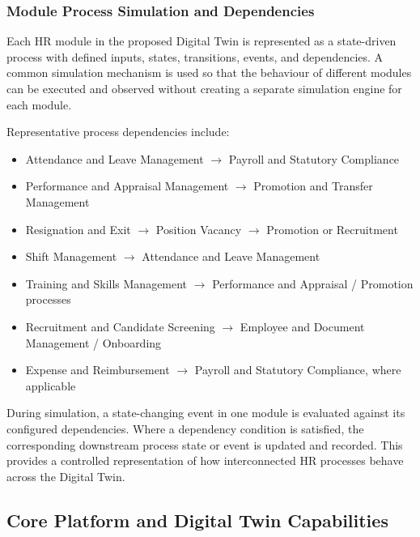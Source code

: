 \documentclass[12pt,a4paper]{article}
\begin{document}
\subsubsection{Module Process Simulation and Dependencies}

Each HR module in the proposed Digital Twin is represented as a
state-driven process with defined inputs, states, transitions,
events, and dependencies. A common simulation mechanism is used so
that the behaviour of different modules can be executed and observed
without creating a separate simulation engine for each module.

Representative process dependencies include:

\begin{itemize}
    \item Attendance and Leave Management $\rightarrow$ Payroll and
    Statutory Compliance
    \item Performance and Appraisal Management $\rightarrow$
    Promotion and Transfer Management
    \item Resignation and Exit $\rightarrow$ Position Vacancy $\rightarrow$
    Promotion or Recruitment
    \item Shift Management $\rightarrow$ Attendance and Leave
    Management
    \item Training and Skills Management $\rightarrow$ Performance and
    Appraisal / Promotion processes
    \item Recruitment and Candidate Screening $\rightarrow$
    Employee and Document Management / Onboarding
    \item Expense and Reimbursement $\rightarrow$ Payroll and
    Statutory Compliance, where applicable
\end{itemize}

During simulation, a state-changing event in one module is evaluated
against its configured dependencies. Where a dependency condition is
satisfied, the corresponding downstream process state or event is
updated and recorded. This provides a controlled representation of
how interconnected HR processes behave across the Digital Twin.


\subsection{Core Platform and Digital Twin Capabilities}
\end{document}
